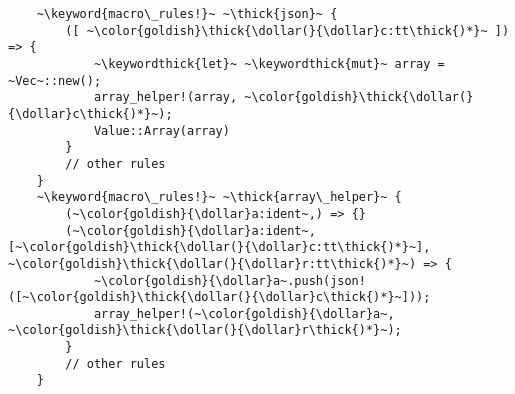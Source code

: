 \documentclass[usepdftitle=false,aspectratio=169]{beamer}
\newcommand{\dollar}{\makebox[\widthof{\$}][c]{\$}}
\newcommand{\thick}[1]{\contourlength{0.16pt}\contour[10]{black}{#1}}
\newcommand{\keyword}[1]{\color{greenish}#1}
\newcommand{\keywordthick}[1]{\color{greenish}\contourlength{0.20pt}\contour[10]{greenish}{#1}}
\begin{document}
\begin{frame}[fragile]
  \vspace*{-8pt}
  \begin{verbatim}
    ~\keyword{macro\_rules!}~ ~\thick{json}~ {
        ([ ~\color{goldish}\thick{\dollar(}{\dollar}c:tt\thick{)*}~ ]) => {
            ~\keywordthick{let}~ ~\keywordthick{mut}~ array = ~Vec~::new();
            array_helper!(array, ~\color{goldish}\thick{\dollar(}{\dollar}c\thick{)*}~);
            Value::Array(array)
        }
        // other rules
    }
    ~\keyword{macro\_rules!}~ ~\thick{array\_helper}~ {
        (~\color{goldish}{\dollar}a:ident~,) => {}
        (~\color{goldish}{\dollar}a:ident~, [~\color{goldish}\thick{\dollar(}{\dollar}c:tt\thick{)*}~], ~\color{goldish}\thick{\dollar(}{\dollar}r:tt\thick{)*}~) => {
            ~\color{goldish}{\dollar}a~.push(json!([~\color{goldish}\thick{\dollar(}{\dollar}c\thick{)*}~]));
            array_helper!(~\color{goldish}{\dollar}a~, ~\color{goldish}\thick{\dollar(}{\dollar}r\thick{)*}~);
        }
        // other rules
    }
  \end{verbatim}
\end{frame}
\end{document}
